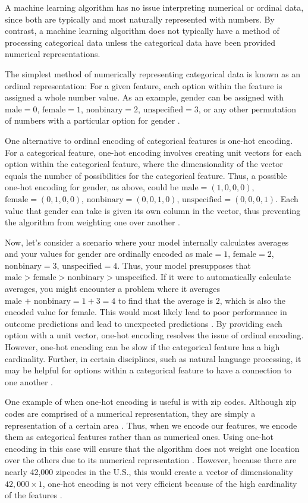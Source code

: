 \documentclass[12pt,letterpaper]{article}
\theoremstyle{plain}
\theoremstyle{definition}
\begin{document}
A machine learning algorithm has no issue interpreting numerical or ordinal data, since both are typically and most naturally represented with numbers. By contrast, a machine learning algorithm does not typically have a method of processing categorical data unless the categorical data have been provided numerical representations.

The simplest method of numerically representing categorical data is known as an ordinal representation: For a given feature, each option within the feature is assigned a whole number value. As an example, gender can be assigned with $\text{male} = 0$, $\text{female} = 1$, $\text{nonbinary} = 2$, $\text{unspecified} = 3$, or any other permutation of numbers with a particular option for gender \cite{ordinal}. 

One alternative to ordinal encoding of categorical features is one-hot encoding. For a categorical feature, one-hot encoding involves creating unit vectors for each option within the categorical feature, where the dimensionality of the vector equals the number of possibilities for the categorical feature. Thus, a possible one-hot encoding for gender, as above, could be $\text{male} = (1, 0, 0, 0)$, $\text{female} = (0, 1, 0, 0)$, $\text{nonbinary} = (0, 0, 1, 0)$, $\text{unspecified} = (0, 0, 0, 1)$. Each value that gender can take is given its own column in the vector, thus preventing the algorithm from weighting one over another \cite{gender}. 

Now, let's consider a scenario where your model internally calculates averages and your values for gender are ordinally encoded as $\text{male}=1$, $\text{female}=2$, $\text{nonbinary}=3$, $\text{unspecified}=4$. Thus, your model presupposes that $\text{male}>\text{female}>\text{nonbinary}>\text{unspecified}$. If it were to automatically calculate averages, you might encounter a problem where it averages $\text{male + nonbinary}=1+3=4$ to find that the average is $2$, which is also the encoded value for female. This would most likely lead to poor performance in outcome predictions and lead to unexpected predictions \cite{gender}. By providing each option with a unit vector, one-hot encoding resolves the issue of ordinal encoding. However, one-hot encoding can be slow if the categorical feature has a high cardinality. Further, in certain disciplines, such as natural language processing, it may be helpful for options within a categorical feature to have a connection to one another \cite{naturallang}. 

One example of when one-hot encoding is useful is with zip codes. Although zip codes are comprised of a numerical representation, they are simply a representation of a certain area \cite{zipcode}. Thus, when we encode our features, we encode them as categorical features rather than as numerical ones. Using one-hot encoding in this case will ensure that the algorithm does not weight one location over the others due to its numerical representation \cite{onehotencode}. However, because there are nearly 42,000 zipcodes in the U.S., this would create a vector of dimensionality $42,000 \times 1$, one-hot encoding is not very efficient because of the high cardinality of the features \cite{zipcodestat}. 
\end{document}
